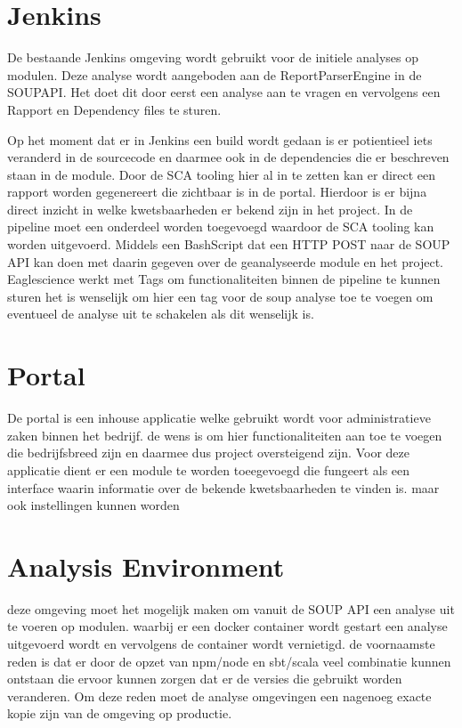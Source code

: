     \section{Jenkins} De bestaande Jenkins omgeving wordt gebruikt voor de initiele analyses op modulen. Deze analyse wordt aangeboden aan de ReportParserEngine in de SOUPAPI. Het doet dit door eerst een analyse aan te vragen en vervolgens een Rapport en Dependency files te sturen.

Op het moment dat er in Jenkins een build wordt gedaan is er potientieel iets veranderd in de sourcecode en daarmee ook in de dependencies die er beschreven staan in de module. Door de SCA tooling hier al in te zetten kan er direct een rapport worden gegenereert die zichtbaar is in de portal. Hierdoor is er bijna direct inzicht in welke kwetsbaarheden er bekend zijn in het project. In de pipeline moet een onderdeel worden toegevoegd waardoor de SCA tooling kan worden uitgevoerd. Middels een BashScript dat een HTTP POST naar de SOUP API kan doen met daarin gegeven over de geanalyseerde module en het project. Eaglescience werkt met Tags om functionaliteiten binnen de pipeline te kunnen sturen het is wenselijk om hier een tag voor de soup analyse toe te voegen om eventueel de analyse uit te schakelen als dit wenselijk is.
    \section{Portal} De portal is een inhouse applicatie welke gebruikt wordt voor administratieve zaken binnen het bedrijf. de wens is om hier functionaliteiten aan toe te voegen die bedrijfsbreed zijn en daarmee dus project oversteigend zijn. Voor deze applicatie dient er een module te worden toeegevoegd die fungeert als een interface waarin informatie over de bekende kwetsbaarheden te vinden is. maar ook instellingen kunnen worden
    \section{Analysis Environment} deze omgeving moet het mogelijk maken om vanuit de SOUP API een analyse uit te voeren op modulen. waarbij er een docker container wordt gestart een analyse uitgevoerd wordt en vervolgens de container wordt vernietigd. de voornaamste reden is dat er door de opzet van npm/node en sbt/scala veel combinatie kunnen ontstaan die ervoor kunnen zorgen dat er de versies die gebruikt worden veranderen. Om deze reden moet de analyse omgevingen een nagenoeg exacte kopie zijn van de omgeving op productie.
